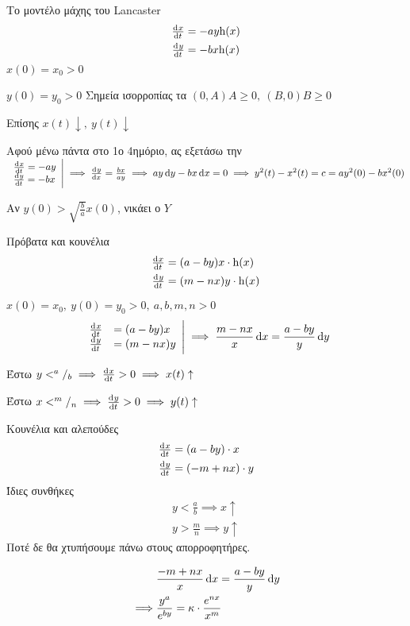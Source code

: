 \documentclass[11pt,a4paper,titlepage,final]{article}
\begin{document}
\begin{exercise*}{Το μοντέλο μάχης του \textlatin{Lancaster}}
\begin{align*}
\od{x}{t} &= -ay\mathrm h(x) \\
\od{y}{t} &= -bx\mathrm h(x)
\end{align*}
\( x(0)=x_0 > 0 \)

\( y(0)=y_0 > 0 \)
\tcblower
Σημεία ισορροπίας τα \( (0,A) A \geq 0,\ (B,0) B \geq 0 \)

Επίσης \( x(t) \downarrow,\ y(t) \downarrow \)

Αφού μένω πάντα στο 1ο 4ημόριο, ας εξετάσω την
\(  \left.
\begin{array}{l}
\od{x}{t}=-ay \\ \od{y}{t} = -bx
\end{array} \right| \implies \od{y}{x}=\frac{bx}{ay} \\ \implies ay\dif y -bx\dif x = 0 \implies
y^2(t)-x^2(t)=c=ay^2(0)-bx^2(0)
 \)
 
 Αν \( y(0) > \sqrt{\frac{b}{a}} x(0) \), νικάει ο \( Y \)


\end{exercise*}

\begin{exercise*}{Πρόβατα και κουνέλια}
\begin{align*}
\od{x}{t} &= (a-by)x \cdot \mathrm h(x) \\
\od{y}{t} &= (m-nx)y \cdot \mathrm h(x)
\end{align*}

\( x(0) = x_0, \ y(0) = y_0 >0,\ a,b,m,n>0 \)
\tcblower
\[
\left.
\begin{array}{ll}
\od{x}{t} &= (a-by)x \\ \od{y}{t} &= (m-nx)y
\end{array}
\right| \implies \frac{m-nx}{x} \dif x = \frac{a-by}{y} \dif y
\]

Έστω \( y < ^a/_b \implies \od{x}{t} > 0 \implies x(t) \uparrow \)

Έστω \( x < ^m/_n \implies \od{y}{t} > 0 \implies y(t) \uparrow \)


\end{exercise*}


\begin{exercise*}{Κουνέλια και αλεπούδες}
\begin{align*}
\od{x}{t} &= (a-by)\cdot x \\
\od{y}{t} &= (-m+nx)\cdot y
\end{align*}
Ίδιες συνθήκες
\tcblower
\begin{align*}
y < \frac{a}{b} \implies x \uparrow \\
y > \frac{m}{n} \implies y \uparrow
\end{align*}
Ποτέ δε θα χτυπήσουμε πάνω στους απορροφητήρες.

\begin{align*}
& \frac{-m+nx}{x}\dif x = \frac{a-by}{y}\dif y \\
\implies & \frac{y^a}{e^{by}} = \kappa \cdot \frac{e^{nx}}{x^m}
\end{align*}
\end{exercise*}
\end{document}
